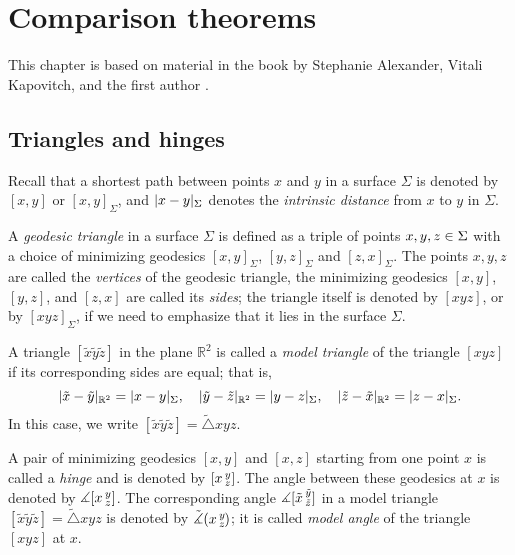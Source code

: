 \chapter{Comparison theorems}
\label{chap:comparison}

This chapter is based on material in the book by Stephanie Alexander, Vitali Kapovitch, and the first author \cite{alexander-kapovitch-petrunin2027}.

\section{Triangles and hinges}

Recall that a shortest path between points $x$ and $y$ in a surface $\Sigma$ is denoted by $[x,y]$ or $[x,y]_\Sigma$, and
$\dist{x}{y}\Sigma$ denotes the \emph{intrinsic distance} from $x$ to $y$ in $\Sigma$.

A \emph{geodesic triangle} in a surface $\Sigma$ is defined as a triple of points $x,y,z\z\in \Sigma$ with a choice of minimizing geodesics $[x,y]_\Sigma$, $[y,z]_\Sigma$ and $[z,x]_\Sigma$.
The points $x,y,z$ are called the {}\emph{vertices} of the geodesic triangle,
the minimizing geodesics $[x,y]$, $[y,z]$, and $[z,x]$ are called its {}\emph{sides};
the triangle itself is denoted by $[xyz]$, or by $[xyz]_\Sigma$, if we need to emphasize that it lies in the surface $\Sigma$.

A triangle $[\tilde x\tilde y\tilde z]$ in the plane $\mathbb{R}^2$ is called a \emph{model triangle} of the triangle $[xyz]$
if its corresponding sides are equal;
that is,
\[\dist{\tilde x}{\tilde y}{\mathbb{R}^2}=\dist{x}{y}\Sigma,
\quad
\dist{\tilde y}{\tilde z}{\mathbb{R}^2}=\dist{y}{z}\Sigma,
\quad
\dist{\tilde z}{\tilde x}{\mathbb{R}^2}=\dist{z}{x}\Sigma.
\]
In this case, we write $[\tilde x\tilde y\tilde z]=\tilde\triangle xyz$.

A pair of minimizing geodesics $[x,y]$ and $[x,z]$ starting from one point $x$ is called a \emph{hinge} and is denoted by $[x\,{}^{y}_{z}]$.
The angle between these geodesics at $x$ is denoted by $\measuredangle[x\,{}^{y}_{z}]$.
The corresponding angle $\measuredangle[\tilde x\,{}^{\tilde y}_{\tilde z}]$ in a model triangle $[\tilde x\tilde y\tilde z]=\tilde\triangle xyz$ is denoted by $\tilde\measuredangle(x\,{}^{y}_{z}\hspace{-0.2ex})$;
it is called \emph{model angle} of the triangle $[xyz]$ at $x$.

